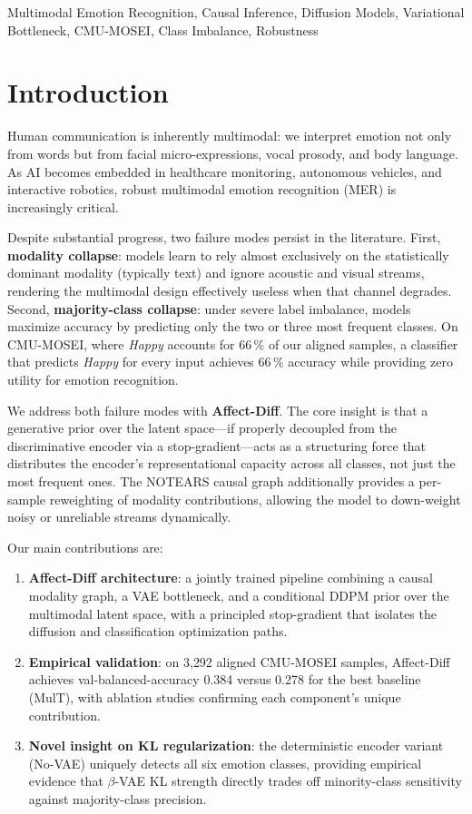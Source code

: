 \documentclass[conference]{IEEEtran}
\begin{document}
\begin{IEEEkeywords}
Multimodal Emotion Recognition, Causal Inference, Diffusion Models,
Variational Bottleneck, CMU-MOSEI, Class Imbalance, Robustness
\end{IEEEkeywords}

\section{Introduction}

Human communication is inherently multimodal: we interpret emotion not only
from words but from facial micro-expressions, vocal prosody, and body language.
As AI becomes embedded in healthcare monitoring, autonomous vehicles, and
interactive robotics, robust multimodal emotion recognition (MER) is
increasingly critical.

Despite substantial progress, two failure modes persist in the literature.
First, \textbf{modality collapse}: models learn to rely almost exclusively on
the statistically dominant modality (typically text) and ignore acoustic and
visual streams, rendering the multimodal design effectively useless when that
channel degrades.  Second, \textbf{majority-class collapse}: under severe label
imbalance, models maximize accuracy by predicting only the two or three most
frequent classes.  On CMU-MOSEI, where \emph{Happy} accounts for 66\,\% of our
aligned samples, a classifier that predicts \emph{Happy} for every input
achieves 66\,\% accuracy while providing zero utility for emotion recognition.

We address both failure modes with \textbf{Affect-Diff}.  The core insight is
that a generative prior over the latent space---if properly decoupled from the
discriminative encoder via a stop-gradient---acts as a structuring force that
distributes the encoder's representational capacity across all classes, not just
the most frequent ones.  The NOTEARS causal graph additionally provides a
per-sample reweighting of modality contributions, allowing the model to
down-weight noisy or unreliable streams dynamically.

Our main contributions are:
\begin{enumerate}
    \item \textbf{Affect-Diff architecture}: a jointly trained pipeline
    combining a causal modality graph, a VAE bottleneck, and a conditional
    DDPM prior over the multimodal latent space, with a principled stop-gradient
    that isolates the diffusion and classification optimization paths.
    \item \textbf{Empirical validation}: on 3{,}292 aligned CMU-MOSEI samples,
    Affect-Diff achieves val-balanced-accuracy 0.384 versus 0.278 for the best
    baseline (MulT), with ablation studies confirming each component's unique
    contribution.
    \item \textbf{Novel insight on KL regularization}: the deterministic
    encoder variant (No-VAE) uniquely detects all six emotion classes, providing
    empirical evidence that $\beta$-VAE KL strength directly trades off
    minority-class sensitivity against majority-class precision.
\end{enumerate}
\end{document}
